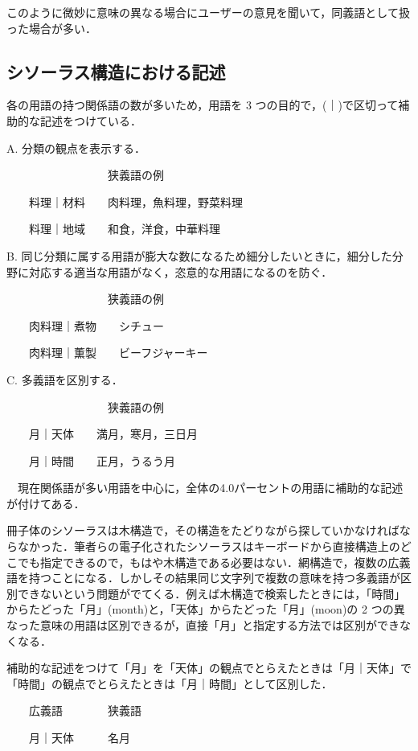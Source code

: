 \documentclass[japanese]{jnlp_1.4}
\begin{document}
このように微妙に意味の異なる場合にユーザーの意見を聞いて，同義語として扱った場合が多い．



\subsection{シソーラス構造における記述}


各の用語の持つ関係語の数が多いため，用語を 3 つの目的で，(｜)で区切って補助的な記述をつけている．

A. 分類の観点を表示する．

　　　　　　　　　狭義語の例

　　料理｜材料　　肉料理，魚料理，野菜料理

　　料理｜地域　　和食，洋食，中華料理

B. 同じ分類に属する用語が膨大な数になるため細分したいときに，細分した分野に対応する適当な用語がなく，恣意的な用語になるのを防ぐ．

　　　　　　　　　狭義語の例

　　肉料理｜煮物　　シチュー

　　肉料理｜薫製　　ビーフジャーキー

C. 多義語を区別する．

　　　　　　　　　狭義語の例

　　月｜天体　　満月，寒月，三日月

　　月｜時間　　正月，うるう月

　現在関係語が多い用語を中心に，全体の4.0パーセントの用語に補助的な記述が付けてある．


冊子体のシソーラスは木構造で，その構造をたどりながら探していかなければならなかった．筆者らの電子化されたシソーラスはキーボードから直接構造上のどこでも指定できるので，もはや木構造である必要はない．網構造で，複数の広義語を持つことになる．しかしその結果同じ文字列で複数の意味を持つ多義語が区別できないという問題がでてくる．例えば木構造で検索したときには，「時間」からたどった「月」(month)と，「天体」からたどった「月」(moon)の 2 つの異なった意味の用語は区別できるが，直接「月」と指定する方法では区別ができなくなる．

補助的な記述をつけて「月」を「天体」の観点でとらえたときは「月｜天体」で「時間」の観点でとらえたときは「月｜時間」として区別した．

　　広義語　　　　狭義語

　　月｜天体　　　名月
\end{document}
